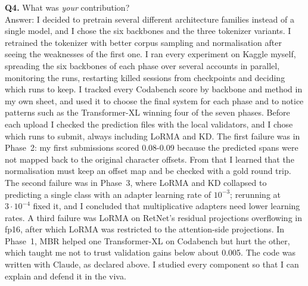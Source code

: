 \documentclass[11pt, oneside]{article}
\begin{document}
\noindent
\textbf{Q4.} What was \emph{your} contribution?\\[0.2em]
Answer: I decided to pretrain several different architecture families instead of a single model, and I chose the six backbones and the three tokenizer variants. I retrained the tokenizer with better corpus sampling and normalisation after seeing the weaknesses of the first one. I ran every experiment on Kaggle myself, spreading the six backbones of each phase over several accounts in parallel, monitoring the runs, restarting killed sessions from checkpoints and deciding which runs to keep. I tracked every Codabench score by backbone and method in my own sheet, and used it to choose the final system for each phase and to notice patterns such as the Transformer-XL winning four of the seven phases. Before each upload I checked the prediction files with the local validators, and I chose which runs to submit, always including LoRMA and KD. The first failure was in Phase~2: my first submissions scored 0.08-0.09 because the predicted spans were not mapped back to the original character offsets. From that I learned that the normalisation must keep an offset map and be checked with a gold round trip. The second failure was in Phase~3, where LoRMA and KD collapsed to predicting a single class with an adapter learning rate of $10^{-3}$; rerunning at $3\cdot10^{-4}$ fixed it, and I concluded that multiplicative adapters need lower learning rates. A third failure was LoRMA on RetNet's residual projections overflowing in fp16, after which LoRMA was restricted to the attention-side projections. In Phase~1, MBR helped one Transformer-XL on Codabench but hurt the other, which taught me not to trust validation gains below about 0.005. The code was written with Claude, as declared above. I studied every component so that I can explain and defend it in the viva.



\end{document}
